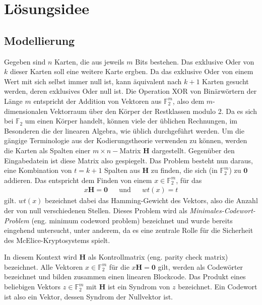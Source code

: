 \documentclass[a4paper,10pt,ngerman]{scrartcl}
\begin{document}
\maketitle
\tableofcontents

\section{Lösungsidee}
\subsection{Modellierung}
Gegeben sind $n$ Karten, die aus jeweils $m$ Bits bestehen. Das exklusive Oder von $k$ dieser Karten soll eine weitere Karte ergben.
Da das exklusive Oder von einem Wert mit sich selbst immer null ist, kann äquivalent nach $k + 1$ Karten gesucht werden, deren exklusives Oder null ist.
Die Operation XOR von Binärwörtern der Länge $m$ entspricht der Addition von Vektoren aus $\mathbb{F}_2^m$, also dem $m$-dimensionalen Vektorraum über den Körper der Restklassen modulo 2. 
Da es sich bei $\mathbb{F}_2$ um einen Körper handelt, können viele der üblichen Rechnungen, im Besonderen die der linearen Algebra, wie üblich durchgeführt werden. 
Um die gängige Terminologie aus der Kodierungstheorie verwenden zu können, werden die Karten als Spalten einer $m\times n-$Matrix $\mathbf{H}$ dargestellt. Gegenüber den Eingabedatein ist diese Matrix also gespiegelt. 
Das Problem besteht nun daraus, eine Kombination von $t = k + 1$ Spalten aus $\mathbf{H}$ zu finden, die sich (in $\mathbb{F}_2^m$) zu $\mathbf{0}$ addieren. Das entspricht dem Finden von einem $x \in \mathbb{F}^m_2$, für das 
\begin{align*}
    x \mathbf{H} = \mathbf{0} && \text{und} && wt(x) = t
\end{align*}
gilt. $wt(x)$ bezeichnet dabei das Hamming-Gewicht des Vektors, also die Anzahl der von null verschiedenen Stellen. 
Dieses Problem wird als \textit{Minimales-Codewort-Problem} (eng. minimum codeword problem) bezeichnet und wurde bereits eingehend untersucht, unter anderem, da es eine zentrale Rolle für die Sicherheit des McElice-Kryptosystems spielt. 

In diesem Kontext wird $\mathbf{H}$ als Kontrollmatrix (eng. parity check matrix) bezeichnet.
Alle Vektoren $x \in \mathbb{F}^m_2$ für die $x \mathbf{H} = \mathbf{0}$ gilt,  werden als Codewörter bezeichnet und bilden zusammen einen linearen Blockcode. Das Produkt eines beliebigen Vektors $z \in \mathbb{F}^m_2$ mit $\mathbf{H}$ ist ein Syndrom von $z$ bezeichnet. Ein Codewort ist also ein Vektor, dessen Syndrom der Nullvektor ist. 
\end{document}

